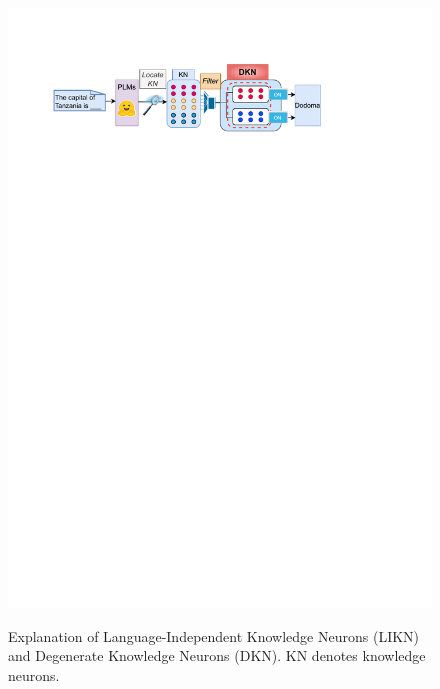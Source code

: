 \documentclass[]{article}
\begin{document}
\begin{figure}
{    \includegraphics[width=0.95\linewidth]{figures/intro2.drawio.pdf}
    \label{fig:intro2}
  }
  \caption{Explanation of Language-Independent Knowledge Neurons (LIKN) and Degenerate Knowledge Neurons (DKN). KN denotes knowledge neurons.}
  \label{fig-intro}
\end{figure}
\end{document}
